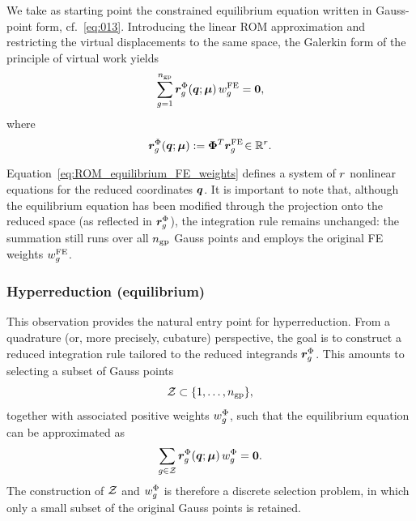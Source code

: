 \documentclass[11pt,a4paper]{article}
\newcommand{\PROMPT}[1]{ }
\begin{document}
\PROMPT{}
%
\PROMPT{}



We take as starting point the constrained equilibrium equation written in
Gauss-point form, cf.~\eqref{eq:013}. Introducing the linear ROM approximation
and restricting the virtual displacements to the same space, the Galerkin form
of the principle of virtual work yields
\begin{equation}
\label{eq:ROM_equilibrium_FE_weights}
      \sum_{g=1}^{n_{\mathrm{gp}}}
    \bm{r}^{\Phi}_{g}(\bm{q};\bm{\mu})\,w^{\mathrm{FE}}_{g}
    =
    \bm{0},
\end{equation}
where
\begin{equation}
\label{eq:rPhi_definition}
    \bm{r}^{\Phi}_{g}(\bm{q};\bm{\mu})
    :=
    \bm{\Phi}^T
    \bm{r}^{\mathrm{FE}}_{g}\!     \in \mathbb{R}^{r}.
\end{equation}

Equation~\eqref{eq:ROM_equilibrium_FE_weights} defines a system of $r$
nonlinear equations for the reduced coordinates $\bm{q}$. It is important to note
that, although the equilibrium equation has been modified through the projection
onto the reduced space (as reflected in $\bm{r}^{\Phi}_{g}$), the integration rule remains
unchanged: the summation still runs over all $n_{\mathrm{gp}}$ Gauss points and employs the
original FE weights $w^{\mathrm{FE}}_{g}$.


\subsubsection{Hyperreduction (equilibrium)}

This observation provides the natural entry point for hyperreduction. From a
quadrature (or, more precisely, cubature) perspective, the goal is to construct a
reduced integration rule tailored to the reduced integrands $\bm{r}^{\Phi}_{g}$. This
amounts to selecting a subset of Gauss points
\[
    \mathcal{Z} \subset \{1,\ldots,n_{\mathrm{gp}}\},
\]
together with associated positive weights $w^{\Phi}_{g}$, such that the equilibrium
equation can be approximated as
\begin{equation}
\label{eq:013aaa}
      \sum_{g\in \mathcal{Z}}
    \bm{r}^{\Phi}_{g}(\bm{q};\bm{\mu})\,w^{\Phi}_{g}
    =
    \bm{0}.
\end{equation}
The construction of $\mathcal{Z}$ and $w^{\Phi}_{g}$ is therefore a discrete selection
problem, in which only a small subset of the original Gauss points is retained.
\end{document}
